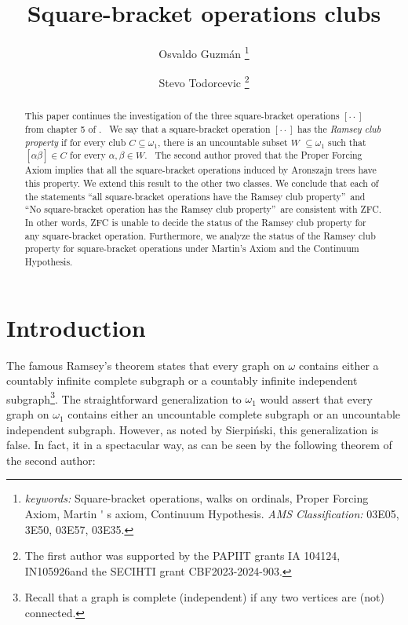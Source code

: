 \documentclass{article}
\providecommand{\U}[1]{\protect\rule{.1in}{.1in}}
\begin{document}
\date{}
\title{Square-bracket operations clubs}
\author{Osvaldo Guzm\'{a}n \thanks{\textit{keywords: }Square-bracket operations, walks
on ordinals, Proper Forcing Axiom, Martin%
\'{}%
s axiom, Continuum Hypothesis. \newline\textit{AMS Classification:} 03E05,
3E50, 03E57, 03E35.}
\and Stevo Todorcevic \thanks{The first author was supported by the PAPIIT grants
IA 104124, IN105926and the SECIHTI grant CBF2023-2024-903.}}
\maketitle

\begin{abstract}
This paper continues the investigation of the three square-bracket operations
$[\cdot\cdot]$ from chapter 5 of \cite{Walks}. \ We say that a square-bracket
operation $[\cdot\cdot]$ has the \emph{Ramsey club property} if for every club
$C\subseteq\omega_{1}$, there is an uncountable subset $W$ $\subseteq
\omega_{1}$ such that $\left[  \alpha\beta\right]  \in C$ for every
$\alpha,\beta\in W.$ \ The second author proved that the Proper Forcing
Axiom\textsf{ }implies that all the square-bracket operations induced by
Aronszajn trees have this property. We extend this result to the other two
classes. We conclude that each of the statements \textquotedblleft all
square-bracket operations have the Ramsey club property\textquotedblright\ and
\textquotedblleft No square-bracket operation has the Ramsey club
property\textquotedblright\ are consistent with \textsf{ZFC. }In other words,
\textsf{ZFC }is unable to decide the status of the Ramsey club property for
any square-bracket operation. Furthermore, we analyze the status of the Ramsey
club property for square-bracket operations under Martin's Axiom and the
Continuum Hypothesis.

\end{abstract}

\section{Introduction}

The famous Ramsey's theorem states that every graph on $\omega$ contains
either a countably infinite complete subgraph or a countably infinite
independent subgraph\footnote{Recall that a graph is complete (independent) if
any two vertices are (not) connected.}. The straightforward generalization to
$\omega_{1}$ would assert that every graph on $\omega_{1}$ contains either an
uncountable complete subgraph or an uncountable independent subgraph. However,
as noted by Sierpi\'{n}ski, this generalization is false. In fact, it in a
spectacular way, as can be seen by the following theorem of the second author:
\end{document}
